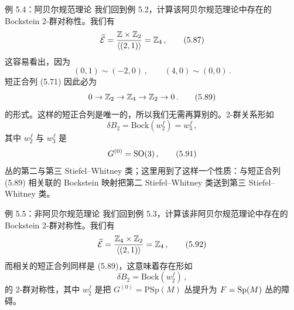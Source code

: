 
\begin{examplebox}{例 5.4：阿贝尔规范理论}
我们回到例 5.2，计算该阿贝尔规范理论中存在的 Bockstein 2-群对称性。我们有
\begin{equation}
  \widehat{\mathcal{E}} = \frac{\mathbb{Z} \times \mathbb{Z}_2}{\langle (2,1)\rangle} = \mathbb{Z}_4\,, \tag{5.87}
\end{equation}
这容易看出，因为
\begin{equation}
  (0,1) \sim (-2,0)\,,\qquad (4,0) \sim (0,0)\,. \tag{5.88}
\end{equation}
短正合列 (5.71) 因此必为
\begin{equation}
  0 \to \mathbb{Z}_2 \to \mathbb{Z}_4 \to \mathbb{Z}_2 \to 0\,. \tag{5.89}
\end{equation}
的形式。这样的短正合列是唯一的，所以我们无需再算别的。2-群关系形如
\begin{equation}
  \delta B_2 = \mathrm{Bock}\left(w_2^f\right) = w_3^f\,, \tag{5.90}
\end{equation}
其中 $w_2^f$ 与 $w_3^f$ 是
\begin{equation}
  G^{(0)} = \mathrm{SO}(3)\,, \tag{5.91}
\end{equation}
丛的第二与第三 Stiefel--Whitney 类；这里用到了这样一个性质：与短正合列 (5.89) 相关联的 Bockstein 映射把第二 Stiefel--Whitney 类送到第三 Stiefel--Whitney 类。
\end{examplebox}

\begin{examplebox}{例 5.5：非阿贝尔规范理论}
我们回到例 5.3，计算该非阿贝尔规范理论中存在的 Bockstein 2-群对称性。我们有
\begin{equation}
  \widehat{\mathcal{E}} = \frac{\mathbb{Z}_4 \times \mathbb{Z}_2}{\langle (2,1)\rangle} = \mathbb{Z}_4\,, \tag{5.92}
\end{equation}
而相关的短正合列同样是 (5.89)，这意味着存在形如
\begin{equation}
  \delta B_2 = \mathrm{Bock}\left(w_2^f\right)\,, \tag{5.93}
\end{equation}
的 2-群对称性，其中 $w_2^f$ 是把 $G^{(0)} = \mathrm{PSp}(M)$ 丛提升为 $F = \mathrm{Sp}(M)$ 丛的障碍。
\end{examplebox}

